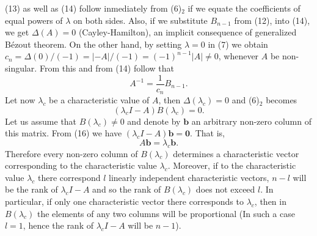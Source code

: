 \documentclass[12pt]{article}
\begin{document}
(13) as well as (14) follow inmediately from (6)${}_2$ if we equate the coefficients of equal powers of $\lambda$ on both sides. Also, if we substitute $B_{n-1}$ from (12), into (14), we get $\Delta(A)=0$ (Cayley-Hamilton), an implicit consequence of generalized B\'ezout theorem. On the other hand, by setting $\lambda=0$ in (7) we obtain $c_n=\Delta(0)/(-1)=|-A|/(-1)=(-1)^{n-1}|A|\neq 0$, whenever $A$ be non- singular. From this and from (14) follow that
\begin{equation}
A^{-1}=\frac{1}{c_n}B_{n-1}.
\end{equation}
Let now $\lambda_c$ be a characteristic value of $A$, then $\Delta(\lambda_c)=0$ and (6)${}_2$ becomes
\begin{equation}
(\lambda_c I-A)B(\lambda_c)=0.
\end{equation}
Let us assume that $B(\lambda_c)\neq 0$ and denote by $\mathbf{b}$ an arbitrary non-zero column of this matrix. From (16) we have $(\lambda_cI-A)\mathbf{b}=\mathbf{0}$. That is,
\begin{equation}
A\mathbf{b}=\lambda_c\mathbf{b}.
\end{equation}
Therefore every non-zero column of $B(\lambda_c)$ determines a characteristic vector corresponding to the characteristic value $\lambda_c$. Moreover, if to the characteristic value $\lambda_c$ there correspond $l$ linearly independent characteristic vectors, $n-l$ will be the rank of $\lambda_cI-A$ and so the rank of $B(\lambda_c)$ does not exceed $l$. In particular, if only one characteristic vector there corresponds to $\lambda_c$, then in $B(\lambda_c)$ the elements of any two columns will be proportional (In such a case $l=1$, hence the rank of $\lambda_cI-A$ will be $n-1$). \\
\end{document}
